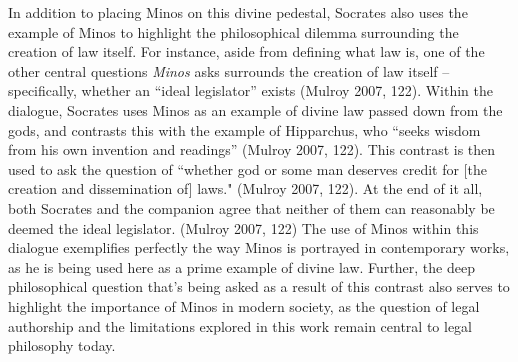 \documentclass[12pt]{article}
\begin{document}
	In addition to placing Minos on this divine pedestal, Socrates also uses the example of Minos to highlight 
	the philosophical dilemma surrounding the creation of law itself. For instance, aside from 
	defining what law is, one of the other central questions \textit{Minos} asks surrounds the creation of 
	law itself -- specifically, whether an ``ideal legislator'' exists (Mulroy 2007, 122). Within the dialogue, 
	Socrates uses Minos as an example of divine law passed down from the gods, and contrasts this with 
	the example of Hipparchus, who ``seeks wisdom from his own invention and readings'' (Mulroy 2007, 122). This 
	contrast is then used to ask the question of ``whether god or some man deserves credit for [the creation 
	and dissemination of] laws." (Mulroy 2007, 122). At the end of it all, both Socrates and the companion 
	agree that neither of them can reasonably be deemed the ideal legislator. (Mulroy 2007, 122)
	The use of Minos within this dialogue exemplifies perfectly 
	the way Minos is portrayed in contemporary works, as he is being used here as a prime example of divine law.
	Further, the deep philosophical question that's being asked as a result of this contrast also serves to
	highlight the importance of Minos in modern society, as the question of legal authorship and the limitations 
	explored in this work remain central to legal philosophy today. 
\end{document}
